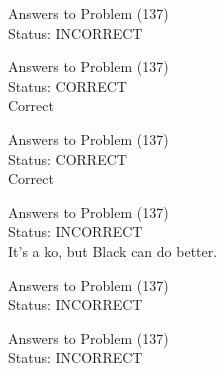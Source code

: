 \documentclass[11pt]{article}
\begin{document}
\begin{minipage}[t]{0.5\textwidth}
  {\centering
  
  Answers to Problem (137)\\
  Status: INCORRECT\\
  
  }
\end{minipage}
\begin{minipage}[t]{0.5\textwidth}
  {\centering
  
  Answers to Problem (137)\\
  Status: CORRECT\\
  Correct\\
  }
\end{minipage}
\begin{minipage}[t]{0.5\textwidth}
  {\centering
  
  Answers to Problem (137)\\
  Status: CORRECT\\
  Correct\\
  }
\end{minipage}
\begin{minipage}[t]{0.5\textwidth}
  {\centering
  
  Answers to Problem (137)\\
  Status: INCORRECT\\
  It's a ko, but Black can do better.\\
  }
\end{minipage}
\begin{minipage}[t]{0.5\textwidth}
  {\centering
  
  Answers to Problem (137)\\
  Status: INCORRECT\\
  
  }
\end{minipage}
\begin{minipage}[t]{0.5\textwidth}
  {\centering
  
  Answers to Problem (137)\\
  Status: INCORRECT\\
  
  }
\end{minipage}
\end{document}
